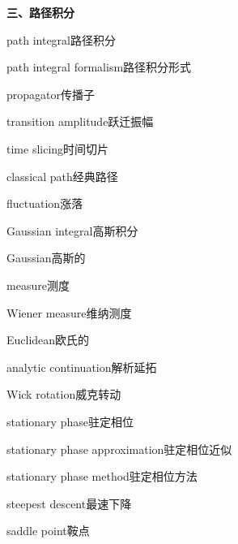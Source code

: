 \filbreak
\vspace{0.9em}
\noindent\textbf{三、路径积分}\par\nobreak\vspace{0.35em}
\begin{multicols}{2}
\raggedright
\setlength{\parindent}{0pt}
\setlength{\parskip}{0.16em}
\linespread{1.02}\selectfont
path integral\hspace{0.9em}路径积分\par
path integral formalism\hspace{0.9em}路径积分形式\par
propagator\hspace{0.9em}传播子\par
transition amplitude\hspace{0.9em}跃迁振幅\par
time slicing\hspace{0.9em}时间切片\par
classical path\hspace{0.9em}经典路径\par
fluctuation\hspace{0.9em}涨落\par
Gaussian integral\hspace{0.9em}高斯积分\par
Gaussian\hspace{0.9em}高斯的\par
measure\hspace{0.9em}测度\par
Wiener measure\hspace{0.9em}维纳测度\par
Euclidean\hspace{0.9em}欧氏的\par
analytic continuation\hspace{0.9em}解析延拓\par
Wick rotation\hspace{0.9em}威克转动\par
stationary phase\hspace{0.9em}驻定相位\par
stationary phase approximation\hspace{0.9em}驻定相位近似\par
stationary phase method\hspace{0.9em}驻定相位方法\par
steepest descent\hspace{0.9em}最速下降\par
saddle point\hspace{0.9em}鞍点\par

\end{multicols}
